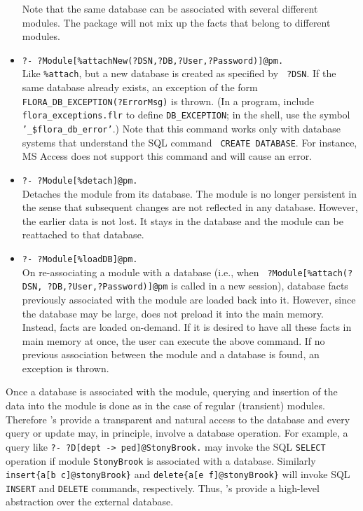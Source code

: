 \begin{itemize}
  Note that the same database can be associated with several different
  modules. The package will not mix up the facts that belong to different
  modules.
\item {\tt ?- ?Module[\%attachNew(?DSN,?DB,?User,?Password)]@pm.}\\
  Like {\tt \%attach}, but a new database is created as specified by {\tt
    ?DSN}.  If the same database already exists, an exception of the form
  {\tt FLORA\_DB\_EXCEPTION(?ErrorMsg)} is thrown.  (In a program, include
  {\tt flora\_exceptions.flr} to define {\tt DB\_EXCEPTION}; in the shell,
  use the symbol {\tt '\_\$flora\_db\_error'}.)  Note that this command
  works only with database systems that understand the SQL command {\tt
    CREATE DATABASE}. For instance, MS Access does not support this command
  and will cause an error.
\item {\tt ?- ?Module[\%detach]@pm.}\\
  Detaches the module from its database. The module is no longer persistent
  in the sense that subsequent changes are not reflected in any database.
  However, the earlier data is not lost. It stays in the database and the
  module can be reattached to that database.
\item {\tt ?- ?Module[\%loadDB]@pm.}\\
  On re-associating a module with a database (i.e., when {\tt
    ?Module[\%attach(?DSN, ?DB,?User,?Password)]@pm} is called in a new
  \FLORA session), database facts previously associated with the module are
  loaded back into it.  However, since the database may be large, \FLORA
  does not preload it into the main memory. Instead, facts are loaded
  on-demand.  If it is desired to have all these facts in main
  memory at once, the user can execute the above command. If no previous
  association between the module and a database is found, an exception is
  thrown.
\end{itemize}



Once a database is associated with the module, querying and insertion of
the data into the module is done as in the case of regular (transient)
modules.  Therefore \psm's provide a transparent and natural access to the
database and every query or update may, in principle, involve a database
operation.  For example, a query like {\tt ?- ?D[dept -> ped]@StonyBrook.}
may invoke the SQL {\tt SELECT} operation if module {\tt StonyBrook} is
associated with a database.  Similarly {\tt  insert\{a[b \fd
  c]@stonyBrook\}} and {\tt delete\{a[e \fd f]@stonyBrook\}}  will invoke
SQL {\tt INSERT} and {\tt DELETE} commands, respectively. Thus, \psm's provide
a high-level abstraction over the external database.

